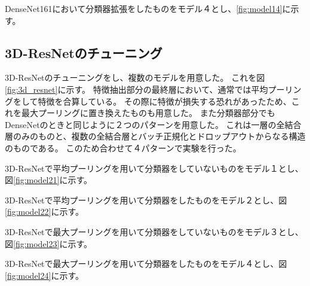DenseNet161において分類器拡張をしたものをモデル４とし、\ref{fig:model14}に示す。

\subsection{3D-ResNetのチューニング}

3D-ResNetのチューニングをし、複数のモデルを用意した。
これを図\ref{fig:3d_resnet}に示す。
特徴抽出部分の最終層において、通常では平均プーリングをして特徴を合算している。
その際に特徴が損失する恐れがあったため、これを最大プーリングに置き換えたものも用意した。
また分類器部分でもDenseNetのときと同じように２つのパターンを用意した。
これは一層の全結合層のみのものと、複数の全結合層とバッチ正規化とドロップアウトからなる構造のものである。
このため合わせて４パターンで実験を行った。

3D-ResNetで平均プーリングを用いて分類器をしていないものをモデル１とし、図\ref{fig:model21}に示す。

3D-ResNetで平均プーリングを用いて分類器をしたものをモデル２とし、図\ref{fig:model22}に示す。

3D-ResNetで最大プーリングを用いて分類器をしていないものをモデル３とし、図\ref{fig:model23}に示す。

3D-ResNetで最大プーリングを用いて分類器をしたものをモデル４とし、図\ref{fig:model24}に示す。
